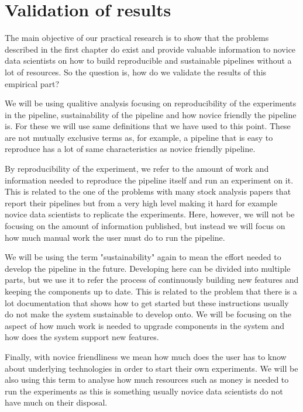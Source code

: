\section{Validation of results}

The main objective of our practical research is to show that the problems described in the first chapter do exist and provide valuable information to novice data scientists on how to build reproducible and sustainable pipelines without a lot of resources.
So the question is, how do we validate the results of this empirical part?

We will be using qualitive analysis focusing on reproducibility of the experiments in the pipeline, sustainability of the pipeline and how novice friendly the pipeline is.
For these we will use same definitions that we have used to this point.
These are not mutually exclusive terms as, for example, a pipeline that is easy to reproduce has a lot of same characteristics as novice friendly pipeline.

By reproducibility of the experiment, we refer to the amount of work and information needed to reproduce the pipeline itself and run an experiment on it.
This is related to the one of the problems with many stock analysis papers that report their pipelines but from a very high level making it hard for example novice data scientists to replicate the experiments.
Here, however, we will not be focusing on the amount of information published, but instead we will focus on how much manual work the user must do to run the pipeline.

We will be using the term "sustainability" again to mean the effort needed to develop the pipeline in the future.
Developing here can be divided into multiple parts, but we use it to refer the process of continuously building new features and keeping the components up to date.
This is related to the problem that there is a lot documentation that shows how to get started but these instructions usually do not make the system sustainable to develop onto.
We will be focusing on the aspect of how much work is needed to upgrade components in the system and how does the system support new features.

Finally, with novice friendliness we mean how much does the user has to know about underlying technologies in order to start their own experiments.
We will be also using this term to analyse how much resources such as money is needed to run the experiments as this is something usually novice data scientists do not have much on their disposal.

